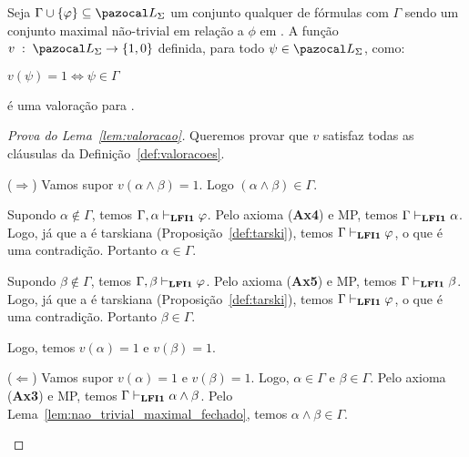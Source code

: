         \begin{lema}\label{lem:valoracao}
            Seja $\Gamma \cup \{\phi\} \subseteq \ling{}$ um conjunto qualquer de fórmulas com $\Gamma$ sendo um conjunto maximal não-trivial em relação a $\phi$ em \lfium{}. A função $v \; : \; \ling \to \{1, 0\}$ definida, para todo $\psi \in \ling$, como:
            \begin{center}
                    $v(\psi) = 1 \Longleftrightarrow \psi \in \Gamma$
            \end{center}

            é uma valoração para \lfium{}.
        \end{lema}

        \begin{proof}[Prova do Lema~\ref{lem:valoracao}]
            Queremos provar que $v$ satisfaz todas as cláusulas da Definição~\ref{def:valoracoes}.

            \begin{provaporcasos}
                

                    \begin{adjustwidth}{1cm}{}
                        \noindent ($\Longrightarrow$) Vamos supor $v(\alpha \land \beta) = 1$. Logo $(\alpha \land \beta) \in \Gamma$. 
                        
                        \noindent Supondo $\alpha \not \in \Gamma$, temos $\Gamma, \alpha \vdash_{{\normalfont\textbf{LFI1}}{}} \varphi$. Pelo axioma (\textbf{Ax4}) e MP, temos $\Gamma \vdash_{{\normalfont\textbf{LFI1}}{}} \alpha$. Logo, já que a \lfium{} é tarskiana (Proposição~\ref{def:tarski}), temos $\Gamma \vdash_{{\normalfont\textbf{LFI1}}{}} \varphi$, o que é uma contradição. Portanto $\alpha \in \Gamma$.
            
                        \noindent Supondo $\beta \not \in \Gamma$, temos $\Gamma, \beta \vdash_{{\normalfont\textbf{LFI1}}{}} \varphi$. Pelo axioma (\textbf{Ax5}) e MP, temos $\Gamma \vdash_{{\normalfont\textbf{LFI1}}{}} \beta$. Logo, já que a \lfium{} é tarskiana (Proposição~\ref{def:tarski}), temos $\Gamma \vdash_{{\normalfont\textbf{LFI1}}{}} \varphi$, o que é uma contradição. Portanto $\beta \in \Gamma$.
            
                        \noindent Logo, temos $v(\alpha) = 1$ e $v(\beta) = 1$.

                    \end{adjustwidth}

                    \begin{adjustwidth}{1cm}{}
                        \noindent ($\Longleftarrow$) Vamos supor $v(\alpha) = 1$ e $v(\beta) = 1$. Logo, $\alpha \in \Gamma$ e $\beta \in \Gamma$. Pelo axioma (\textbf{Ax3}) e MP, temos $\Gamma \vdash_{{\normalfont\textbf{LFI1}}{}} \alpha \land \beta$. Pelo Lema~\ref{lem:nao_trivial_maximal_fechado}, temos $\alpha \land \beta \in \Gamma$.


\end{adjustwidth}
\end{provaporcasos}
\end{proof}

